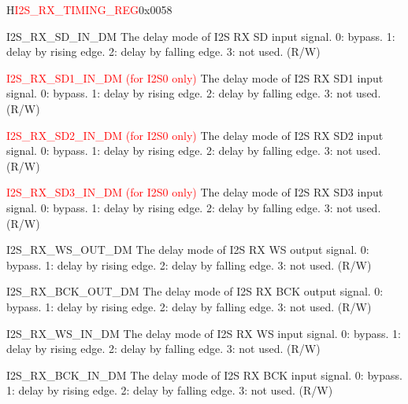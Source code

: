 \begin{register}{H}{\textcolor{red}{I2S\_RX\_TIMING\_REG}}{0x{}0058}\label{regdesc:I2SRXTIMINGREG}
%
%
%
%
%
%
%
%
%
%
%
%
%
%
%
%
\regnewline%
\begin{regdesc}\begin{reglist}
\label{fielddesc:I2SRXSDINDM}\item [I2S\_RX\_SD\_IN\_DM] The delay mode of I2S RX SD input signal. 0: bypass. 1: delay by rising edge. 2: delay by falling edge. 3: not used. (R/W)
\label{fielddesc:I2SRXSD1INDM}\item [\textcolor{red}{I2S\_RX\_SD1\_IN\_DM (for I2S0 only)}] The delay mode of I2S RX SD1 input signal. 0: bypass. 1: delay by rising edge. 2: delay by falling edge. 3: not used. (R/W)
\label{fielddesc:I2SRXSD2INDM}\item [\textcolor{red}{I2S\_RX\_SD2\_IN\_DM (for I2S0 only)}] The delay mode of I2S RX SD2 input signal. 0: bypass. 1: delay by rising edge. 2: delay by falling edge. 3: not used. (R/W)
\label{fielddesc:I2SRXSD3INDM}\item [\textcolor{red}{I2S\_RX\_SD3\_IN\_DM (for I2S0 only)}] The delay mode of I2S RX SD3 input signal. 0: bypass. 1: delay by rising edge. 2: delay by falling edge. 3: not used. (R/W)
\label{fielddesc:I2SRXWSOUTDM}\item [I2S\_RX\_WS\_OUT\_DM] The delay mode of I2S RX WS output signal. 0: bypass. 1: delay by rising edge. 2: delay by falling edge. 3: not used. (R/W)
\label{fielddesc:I2SRXBCKOUTDM}\item [I2S\_RX\_BCK\_OUT\_DM] The delay mode of I2S RX BCK output signal. 0: bypass. 1: delay by rising edge. 2: delay by falling edge. 3: not used. (R/W)
\label{fielddesc:I2SRXWSINDM}\item [I2S\_RX\_WS\_IN\_DM] The delay mode of I2S RX WS input signal. 0: bypass. 1: delay by rising edge. 2: delay by falling edge. 3: not used. (R/W)
\label{fielddesc:I2SRXBCKINDM}\item [I2S\_RX\_BCK\_IN\_DM] The delay mode of I2S RX BCK input signal. 0: bypass. 1: delay by rising edge. 2: delay by falling edge. 3: not used. (R/W)
\end{reglist}\end{regdesc}
\end{register}


